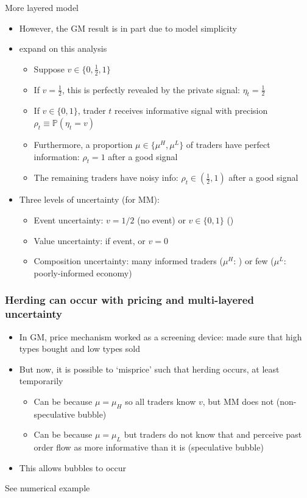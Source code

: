 \documentclass[english,10pt
,aspectratio=169
]{beamer}
\begin{document}
\begin{frame}{More layered model}
	\begin{itemize}
		\item However, the GM result is in part due to model simplicity
		\item \cite{avery_multidimensional_1998} expand on this analysis
		\begin{itemize}
			\item Suppose $v \in \{0,\frac{1}{2},1\}$
			\item If $v=\frac{1}{2}$, this is perfectly revealed by the private signal: $\eta_{t}=\frac{1}{2}$
			\item If $v \in \{0,1\}$, trader $t$ receives informative signal with precision $\rho_t \equiv \mathbb{P}(\eta_{t}=v)$
			\item Furthermore, a proportion $\mu \in \{\mu^{H}, \mu^{L}\}$ of traders have perfect information: $\rho_{t}=1$ after a good signal
			\item The remaining traders have noisy info: $\rho_{t} \in (\frac{1}{2},1)$ after a good signal
		\end{itemize}
		\pause
		\item Three levels of uncertainty (for MM): 
		\begin{itemize}
			\item Event uncertainty: $v=1/2$ (\alert{no event}) or $v \in \{0,1\}$ ()
			\item Value uncertainty: if event,  or \alert{$v=0$}
			\item Composition uncertainty: many informed traders ($\mu^{H}$: ) or few ($\mu^{L}$: \alert{poorly-informed economy})
		\end{itemize}
	\end{itemize}
\end{frame}


\begin{frame}[label=az]
	\frametitle{Herding can occur with pricing and multi-layered uncertainty}
	\begin{itemize}
		\item In GM, price mechanism worked as a screening device: made sure that high types bought and low types sold
		\item But now, it is possible to `misprice' such that herding occurs, at least temporarily
		\begin{itemize}
			\item Can be because $\mu = \mu_H$ so all traders know $v$, but MM does not (non-speculative bubble)
			\item Can be because $\mu = \mu_L$ but traders do not know that and perceive past order flow as more informative than it is (speculative bubble)
		\end{itemize}
		\item This allows bubbles to occur
	\end{itemize}
	See numerical example \hyperlink{layers}{}
\end{frame}
\end{document}
